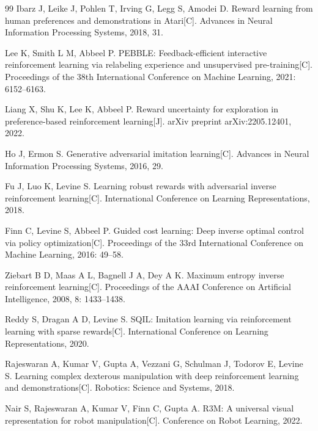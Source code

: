 \begin{thebibliography}{99}
    Ibarz J, Leike J, Pohlen T, Irving G, Legg S, Amodei D.
    Reward learning from human preferences and demonstrations in Atari[C].
    Advances in Neural Information Processing Systems, 2018, 31.
    
    Lee K, Smith L M, Abbeel P.
    PEBBLE: Feedback-efficient interactive reinforcement learning via relabeling experience and unsupervised pre-training[C].
    Proceedings of the 38th International Conference on Machine Learning, 2021: 6152--6163.
    
    Liang X, Shu K, Lee K, Abbeel P.
    Reward uncertainty for exploration in preference-based reinforcement learning[J].
    arXiv preprint arXiv:2205.12401, 2022.
    
    Ho J, Ermon S.
    Generative adversarial imitation learning[C].
    Advances in Neural Information Processing Systems, 2016, 29.
    
    Fu J, Luo K, Levine S.
    Learning robust rewards with adversarial inverse reinforcement learning[C].
    International Conference on Learning Representations, 2018.
    
    Finn C, Levine S, Abbeel P.
    Guided cost learning: Deep inverse optimal control via policy optimization[C].
    Proceedings of the 33rd International Conference on Machine Learning, 2016: 49--58.
    
    Ziebart B D, Maas A L, Bagnell J A, Dey A K.
    Maximum entropy inverse reinforcement learning[C].
    Proceedings of the AAAI Conference on Artificial Intelligence, 2008, 8: 1433--1438.
    
    Reddy S, Dragan A D, Levine S.
    SQIL: Imitation learning via reinforcement learning with sparse rewards[C].
    International Conference on Learning Representations, 2020.
    
    Rajeswaran A, Kumar V, Gupta A, Vezzani G, Schulman J, Todorov E, Levine S.
    Learning complex dexterous manipulation with deep reinforcement learning and demonstrations[C].
    Robotics: Science and Systems, 2018.
    
    Nair S, Rajeswaran A, Kumar V, Finn C, Gupta A.
    R3M: A universal visual representation for robot manipulation[C].
    Conference on Robot Learning, 2022.
    

\end{thebibliography}

